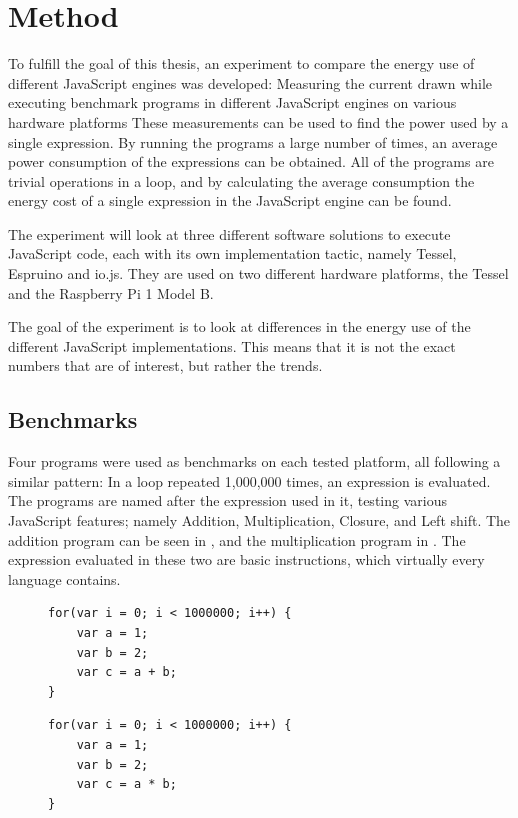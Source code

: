 \chapter{Method}
\label{chap:chapter3}

To fulfill the goal of this thesis, an experiment to compare the energy use of different JavaScript engines was developed:
Measuring the current drawn while executing benchmark programs in different JavaScript engines on various hardware platforms
These measurements can be used to find the power used by a single expression.
By running the programs a large number of times, an average power consumption of the expressions can be obtained.
All of the programs are trivial operations in a loop, and by calculating the average consumption the energy cost of a single expression in the JavaScript engine can be found.

The experiment will look at three different software solutions to execute JavaScript code, each with its own implementation tactic, namely Tessel, Espruino and io.js.
They are used on two different hardware platforms, the Tessel and the Raspberry Pi 1 Model B.

The goal of the experiment is to look at differences in the energy use of the different JavaScript implementations.
This means that it is not the exact numbers that are of interest, but rather the trends.

\section{Benchmarks}
Four programs were used as benchmarks on each tested platform, all following a similar pattern: In a loop repeated 1,000,000 times, an expression is evaluated.
The programs are named after the expression used in it, testing various JavaScript features; namely Addition, Multiplication, Closure, and Left shift.
The addition program can be seen in , and the multiplication program in .
The expression evaluated in these two are basic instructions, which virtually every language contains.

\begin{figure}[h!]
\begin{minipage}{0.45\textwidth}
\begin{verbatim}
for(var i = 0; i < 1000000; i++) {
    var a = 1;
    var b = 2;
    var c = a + b;
}
\end{verbatim}
\label{lst:add}
\end{minipage}\hfill
\begin{minipage}{0.45\textwidth}
\begin{verbatim}
for(var i = 0; i < 1000000; i++) {
    var a = 1;
    var b = 2;
    var c = a * b;
}
\end{verbatim}
\label{lst:multi}
\end{minipage}
\end{figure}


